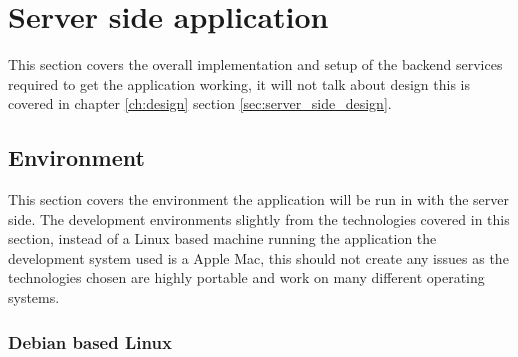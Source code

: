 \section{Server side application}

This section covers the overall implementation and setup of the backend services required to get the application working, it will not talk about design this is covered in chapter \ref{ch:design} section \ref{sec:server_side_design}.

\subsection{Environment}

This section covers the environment the application will be run in with the server side. The development environments slightly from the technologies covered in this section, instead of a Linux based machine running the application the development system used is a Apple Mac, this should not create any issues as the technologies chosen are highly portable and work on many different operating systems.

\subsubsection{Debian based Linux}
\label{sec:debian_server}

